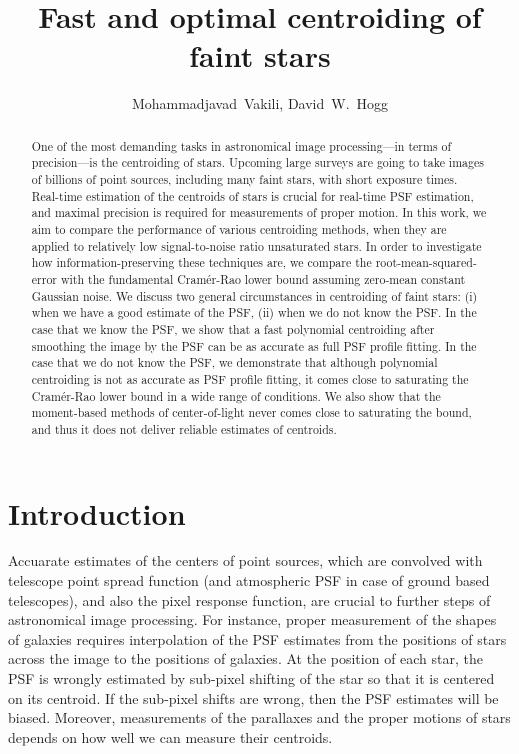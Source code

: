 \documentclass[12pt, preprint]{aastex}
\begin{document}
\author{
  Mohammadjavad~Vakili,
  David~W.~Hogg}

\title{Fast and optimal centroiding of faint stars}

\begin{abstract}
One of the most demanding tasks in astronomical image processing---in terms of precision---is the centroiding of stars. 
Upcoming large surveys are going to take images of billions of point sources, 
including many faint stars, with short exposure times. Real-time estimation of the
centroids of stars is crucial for real-time PSF estimation, and maximal precision is required
for measurements of proper motion. In this work, we aim to compare the performance of
various centroiding methods, when they are applied
to relatively low signal-to-noise ratio unsaturated stars.
In order to investigate how information-preserving these techniques are, we compare
the root-mean-squared-error with the fundamental Cram\'{e}r-Rao
lower bound assuming zero-mean constant Gaussian noise. We discuss two general circumstances in centroiding of faint stars: (i) when we have a good estimate
of the PSF, (ii) when we do not know the PSF. In the case that we know the PSF, 
we show that a fast polynomial centroiding after smoothing the image by the PSF can be 
as accurate as full PSF profile fitting. In the case that we do not
know the PSF, we demonstrate that although polynomial centroiding is not as
accurate as PSF profile fitting, it comes close to saturating the Cram\'{e}r-Rao lower bound
in a wide range of conditions. We also show that the moment-based methods of center-of-light never comes close to 
saturating the bound, and thus it does not deliver reliable estimates of centroids.    

\end{abstract}

\section{Introduction}

Accuarate estimates of the centers of point
sources, which are convolved with telescope point spread function (and atmospheric PSF in case of
ground based telescopes), and also the pixel response function, are crucial to further steps of
astronomical image processing. For instance, proper measurement of the shapes of galaxies
requires interpolation of the PSF estimates from the positions of stars across the
image to the positions of galaxies. At the position of each star, the PSF is wrongly estimated by sub-pixel 
shifting of the star so that it is centered on its centroid. If the sub-pixel shifts are wrong, then 
the PSF estimates will be biased. Moreover, measurements of the parallaxes and the proper motions of stars
depends on how well we can measure their centroids. 
\end{document}
